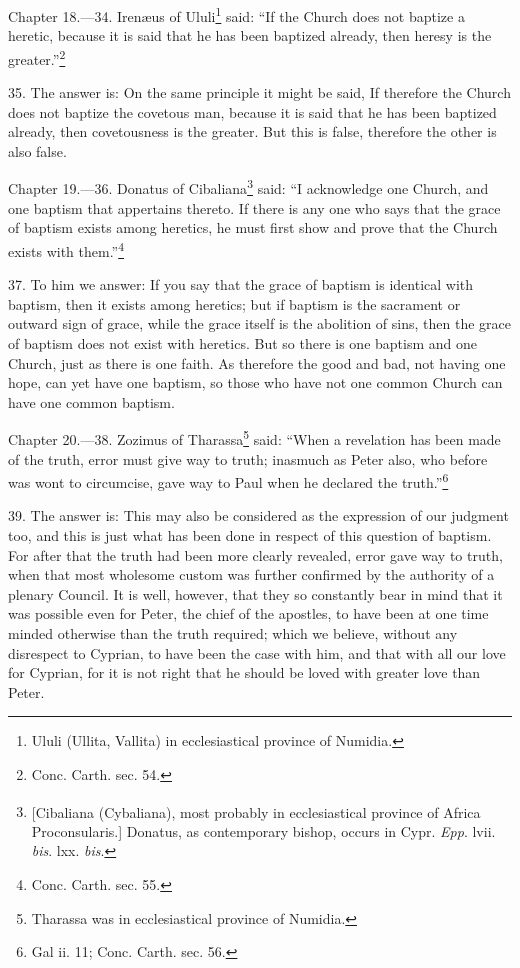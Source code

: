 
Chapter 18.—34. Irenæus of Ululi\footnote{\par  Ululi (Ullita, Vallita) in ecclesiastical province of Numidia.} said: ``If the Church does not baptize a heretic, because it is said that he has been baptized already, then heresy is the greater.''\footnote{\par  Conc. Carth. sec. 54.}

35. The answer is: On the same principle it might be said, If therefore the Church does not baptize the covetous man, because it is said that he has been baptized already, then covetousness is the greater. But this is false, therefore the other is also false.


Chapter 19.—36. Donatus of Cibaliana\footnote{\par  \textsuperscript{ } [Cibaliana (Cybaliana), most probably in ecclesiastical province of Africa Proconsularis.] Donatus, as contemporary bishop, occurs in Cypr. \emph{Epp}. lvii. \emph{bis}. lxx. \emph{bis}.} said: ``I acknowledge one Church, and one baptism that appertains thereto. If there is any one who says that the grace of baptism exists among heretics, he must first show and prove that the Church exists with them.''\footnote{\par  Conc. Carth. sec. 55.}

37. To him we answer: If you say that the grace of baptism is identical with baptism, then it exists among heretics; but if baptism is the sacrament or outward sign of grace, while the grace itself is the abolition of sins, then the grace of baptism does not exist with heretics. But so there is one baptism and one Church, just as there is one faith. As therefore the good and bad, not having one hope, can yet have one baptism, so those who have not one common Church can have one common baptism.


Chapter 20.—38. Zozimus of Tharassa\footnote{\par  Tharassa was in ecclesiastical province of Numidia.} said: ``When a revelation has been made of the truth, error must give way to truth; inasmuch as Peter also, who before was wont to circumcise, gave way to Paul when he declared the truth.''\footnote{\par  Gal ii. 11; Conc. Carth. sec. 56.}

39. The answer is: This may also be considered as the expression of our judgment too, and this is just what has been done in respect of this question of baptism. For after that the truth had been more clearly revealed, error gave way to truth, when that most wholesome custom was further confirmed by the authority of a plenary Council. It is well, however, that they so constantly bear in mind that it was possible even for Peter, the chief of the apostles, to have been at one time minded otherwise than the truth required; which we believe, without any disrespect to Cyprian, to have been the case with him, and that with all our love for Cyprian, for it is not right that he should be loved with greater love than Peter.

